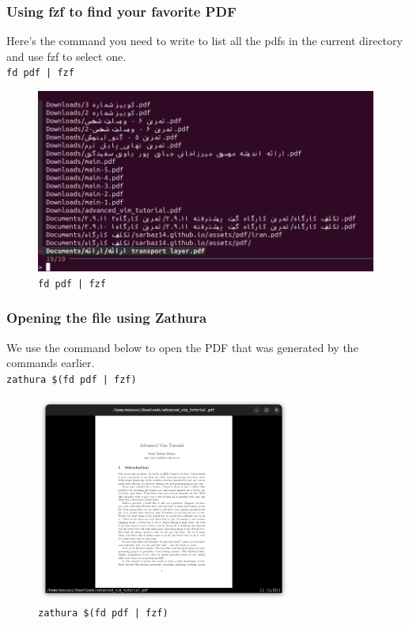 \documentclass[12pt]{article}
\begin{document}
\subsubsection{Using fzf to find your favorite PDF}
Here's the command you need to write to list all the pdfs in the current directory and use fzf to select one.\\
\Large \texttt{fd pdf | fzf}
\begin{figure}
    \centering
    \includegraphics[width=1\textwidth]{fzf.png}
    \caption{\texttt{fd pdf | fzf}}
\end{figure}

\subsubsection{Opening the file using Zathura}
We use the command below to open the PDF that was generated by the commands earlier.\\
\Large \texttt{zathura \$(fd pdf | fzf)}
\begin{figure}
    \centering
    \includegraphics[width=0.75\textwidth]{zathura.png}
    \caption{\texttt{zathura \$(fd pdf | fzf)}}
\end{figure}
\end{document}
